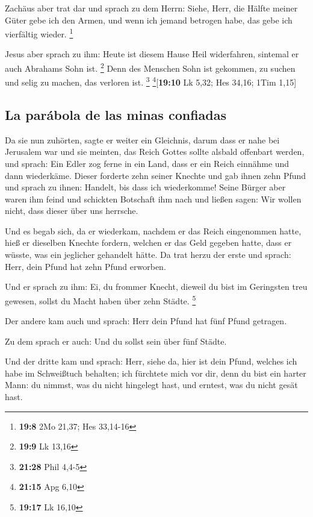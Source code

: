  Zachäus aber trat dar und sprach zu dem Herrn: Siehe,
Herr, die Hälfte meiner Güter gebe ich den Armen, und wenn ich jemand
betrogen habe, das gebe ich vierfältig wieder. \footnote{\textbf{19:8}
  2Mo 21,37; Hes 33,14-16}

 Jesus aber sprach zu ihm: Heute ist diesem Hause Heil
widerfahren, sintemal er auch Abrahams Sohn ist. \footnote{\textbf{19:9}
  Lk 13,16}  Denn des Menschen Sohn ist gekommen, zu
suchen und selig zu machen, das verloren ist. \footnote{\textbf{21:28}
  Phil 4,4-5} \footnote{\textbf{21:15} Apg 6,10}{[}\textbf{19:10} Lk
5,32; Hes 34,16; 1Tim 1,15{]}

\hypertarget{la-paruxe1bola-de-las-minas-confiadas}{%
\subsection{La parábola de las minas
confiadas}\label{la-paruxe1bola-de-las-minas-confiadas}}

 Da sie nun zuhörten, sagte er weiter ein Gleichnis,
darum dass er nahe bei Jerusalem war und sie meinten, das Reich Gottes
sollte alsbald offenbart werden,  und sprach: Ein Edler
zog ferne in ein Land, dass er ein Reich einnähme und dann wiederkäme.
 Dieser forderte zehn seiner Knechte und gab ihnen zehn
Pfund und sprach zu ihnen: Handelt, bis dass ich wiederkomme!
 Seine Bürger aber waren ihm feind und schickten
Botschaft ihm nach und ließen sagen: Wir wollen nicht, dass dieser über
uns herrsche.

 Und es begab sich, da er wiederkam, nachdem er das Reich
eingenommen hatte, hieß er dieselben Knechte fordern, welchen er das
Geld gegeben hatte, dass er wüsste, was ein jeglicher gehandelt hätte.
 Da trat herzu der erste und sprach: Herr, dein Pfund hat
zehn Pfund erworben.

 Und er sprach zu ihm: Ei, du frommer Knecht, dieweil du
bist im Geringsten treu gewesen, sollst du Macht haben über zehn Städte.
\footnote{\textbf{19:17} Lk 16,10}

 Der andere kam auch und sprach: Herr dein Pfund hat fünf
Pfund getragen.

 Zu dem sprach er auch: Und du sollst sein über fünf
Städte.

 Und der dritte kam und sprach: Herr, siehe da, hier ist
dein Pfund, welches ich habe im Schweißtuch behalten; 
ich fürchtete mich vor dir, denn du bist ein harter Mann: du nimmst, was
du nicht hingelegt hast, und erntest, was du nicht gesät hast.


